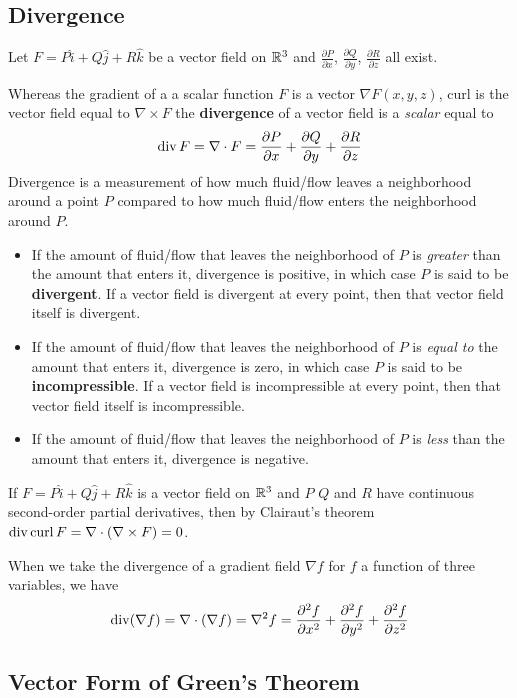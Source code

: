 \subsection{Divergence}

Let $F = P\hat{i} + Q\hat{j} + R\hat{k}$ be a vector field on $\mathbb{R}^3$ and $\frac{\partial P}{\partial x}$, $\frac{\partial Q}{\partial y}$, $\frac{\partial R}{\partial z}$ all exist.

Whereas the gradient of a a scalar function $F$ is a vector $\nabla F(x,y,z)$, curl is the vector field equal to $\nabla \times F$ the \textbf{divergence} of a vector field is a \textit{scalar} equal to $$\operatorname{div}{F} = \nabla \cdot F = \frac{\partial P}{\partial x} + \frac{\partial Q}{\partial y} + \frac{\partial R}{\partial z}$$ Divergence is a measurement of how much fluid/flow leaves a neighborhood around a point $P$ compared to how much fluid/flow enters the neighborhood around $P$.\begin{itemize}
    \item If the amount of fluid/flow that leaves the neighborhood of $P$ is \textit{greater} than the amount that enters it, divergence is positive, in which case $P$ is said to be \textbf{divergent}. If a vector field is divergent at every point, then that vector field itself is divergent.
    \item If the amount of fluid/flow that leaves the neighborhood of $P$ is \textit{equal to} the amount that enters it, divergence is zero, in which case $P$ is said to be \textbf{incompressible}. If a vector field is incompressible at every point, then that vector field itself is incompressible.
    \item If the amount of fluid/flow that leaves the neighborhood of $P$ is \textit{less} than the amount that enters it, divergence is negative.
\end{itemize} If $F = P\hat{i} + Q\hat{j} + R\hat{k}$ is a vector field on $\mathbb{R}^3$ and $P$ $Q$ and $R$ have continuous second-order partial derivatives, then by Clairaut's theorem $\operatorname{div} \operatorname{curl} F = \nabla \cdot ( \nabla \times F) = 0$.

When we take the divergence of a gradient field $\nabla f$ for $f$ a function of three variables, we have $$\operatorname{div} (\nabla f) = \nabla \cdot (\nabla f) = \nabla^2 f = \frac{\partial^2 f}{\partial x^2} + \frac{\partial^2 f}{\partial y^2} + \frac{\partial^2 f}{\partial z^2}$$

\subsection{Vector Form of Green's Theorem}

